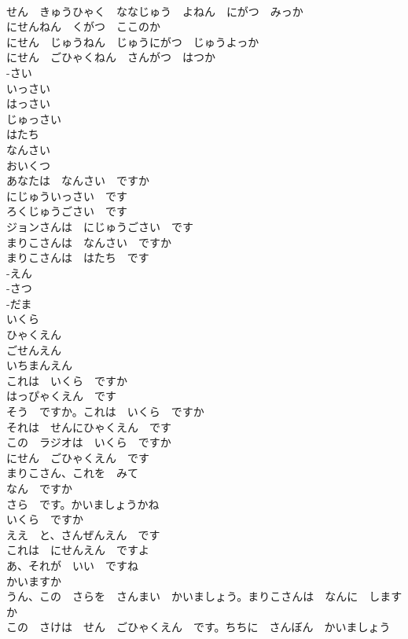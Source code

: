 \documentclass[8pt]{extreport}
\begin{document}
\begin{CJK}{UTF8}{min}
\\	せん　きゅうひゃく　ななじゅう　よねん　にがつ　みっか	
\\	にせんねん　くがつ　ここのか	
\\	にせん　じゅうねん　じゅうにがつ　じゅうよっか	
\\	にせん　ごひゃくねん　さんがつ　はつか	
\\	-さい	
\\	いっさい	
\\	はっさい	
\\	じゅっさい	
\\	はたち	
\\	なんさい	
\\	おいくつ	
\\	あなたは　なんさい　ですか	
\\	にじゅういっさい　です	
\\	ろくじゅうごさい　です	
\\	ジョンさんは　にじゅうごさい　です	
\\	まりこさんは　なんさい　ですか	
\\	まりこさんは　はたち　です	
\\	-えん	
\\	-さつ	
\\	-だま	
\\	いくら	
\\	ひゃくえん	
\\	ごせんえん	
\\	いちまんえん	
\\	これは　いくら　ですか	
\\	はっぴゃくえん　です	
\\	そう　ですか。これは　いくら　ですか	
\\	それは　せんにひゃくえん　です	
\\	この　ラジオは　いくら　ですか	
\\	にせん　ごひゃくえん　です	
\\	まりこさん、これを　みて	
\\	なん　ですか	
\\	さら　です。かいましょうかね	
\\	いくら　ですか	
\\	ええ　と、さんぜんえん　です	
\\	これは　にせんえん　ですよ	
\\	あ、それが　いい　ですね	
\\	かいますか	
\\	うん、この　さらを　さんまい　かいましょう。まりこさんは　なんに　しますか	
\\	この　さけは　せん　ごひゃくえん　です。ちちに　さんぼん　かいましょう	

\end{CJK}
\end{document}
